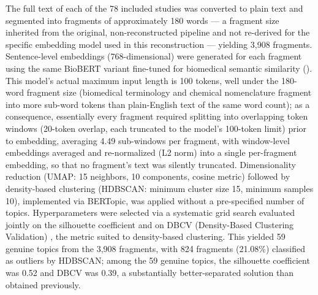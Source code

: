 \documentclass[5p,times,twocolumn]{elsarticle}
\begin{document}
The full text of each of the 78 included studies was converted to plain text and segmented into fragments of approximately 180 words --- a fragment size inherited from the original, non-reconstructed pipeline and not re-derived for the specific embedding model used in this reconstruction --- yielding 3,908 fragments. Sentence-level embeddings (768-dimensional) were generated for each fragment using the same BioBERT variant fine-tuned for biomedical semantic similarity (\texttt{}). This model's actual maximum input length is 100 tokens, well under the 180-word fragment size (biomedical terminology and chemical nomenclature fragment into more sub-word tokens than plain-English text of the same word count); as a consequence, essentially every fragment required splitting into overlapping token windows (20-token overlap, each truncated to the model's 100-token limit) prior to embedding, averaging 4.49 sub-windows per fragment, with window-level embeddings averaged and re-normalized (L2 norm) into a single per-fragment embedding, so that no fragment's text was silently truncated. Dimensionality reduction (UMAP: 15 neighbors, 10 components, cosine metric) followed by density-based clustering (HDBSCAN: minimum cluster size 15, minimum samples 10), implemented via BERTopic, was applied without a pre-specified number of topics. Hyperparameters were selected via a systematic grid search evaluated jointly on the silhouette coefficient \cite{ref87} and on DBCV (Density-Based Clustering Validation) \cite{ref88}, the metric suited to density-based clustering. This yielded 59 genuine topics from the 3,908 fragments, with 824 fragments (21.08\%) classified as outliers by HDBSCAN; among the 59 genuine topics, the silhouette coefficient was 0.52 and DBCV was 0.39, a substantially better-separated solution than obtained previously.
\end{document}
